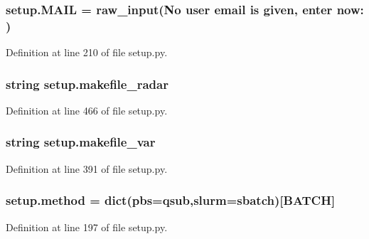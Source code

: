 \subsubsection[{\texorpdfstring{M\+A\+IL}{MAIL}}]{\setlength{\rightskip}{0pt plus 5cm}setup.\+M\+A\+IL = raw\+\_\+input(\textquotesingle{}No user email is given, enter now\+: \textquotesingle{})}\hypertarget{namespacesetup_a4046afba70953007c6ba74e7d9c6bd5f}{}\label{namespacesetup_a4046afba70953007c6ba74e7d9c6bd5f}


Definition at line 210 of file setup.\+py.

\subsubsection[{\texorpdfstring{makefile\+\_\+radar}{makefile_radar}}]{\setlength{\rightskip}{0pt plus 5cm}string setup.\+makefile\+\_\+radar}\hypertarget{namespacesetup_acdec383554bf7f66e8fe06336ebfca98}{}\label{namespacesetup_acdec383554bf7f66e8fe06336ebfca98}


Definition at line 466 of file setup.\+py.

\subsubsection[{\texorpdfstring{makefile\+\_\+var}{makefile_var}}]{\setlength{\rightskip}{0pt plus 5cm}string setup.\+makefile\+\_\+var}\hypertarget{namespacesetup_a11da39b62ca84bc7e300d60f43bf46a8}{}\label{namespacesetup_a11da39b62ca84bc7e300d60f43bf46a8}


Definition at line 391 of file setup.\+py.

\subsubsection[{\texorpdfstring{method}{method}}]{\setlength{\rightskip}{0pt plus 5cm}setup.\+method = dict(pbs=\textquotesingle{}qsub\textquotesingle{},slurm=\textquotesingle{}sbatch\textquotesingle{})\mbox{[}{\bf B\+A\+T\+CH}\mbox{]}}\hypertarget{namespacesetup_ada820daab4af8948c6a81a2bc70ec3e8}{}\label{namespacesetup_ada820daab4af8948c6a81a2bc70ec3e8}


Definition at line 197 of file setup.\+py.

